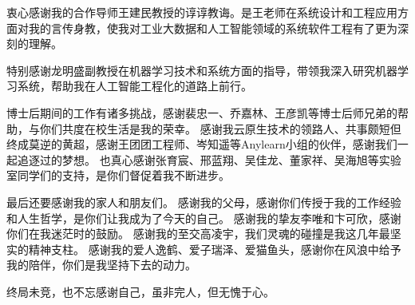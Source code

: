 
\begin{acknowledgements}
  衷心感谢我的合作导师王建民教授的谆谆教诲。是王老师在系统设计和工程应用方面对我的言传身教，使我对工业大数据和人工智能领域的系统软件工程有了更为深刻的理解。

  特别感谢龙明盛副教授在机器学习技术和系统方面的指导，带领我深入研究机器学习系统，帮助我在人工智能工程化的道路上前行。

  博士后期间的工作有诸多挑战，感谢裴忠一、乔嘉林、王彦凯等博士后师兄弟的帮助，与你们共度在校生活是我的荣幸。
  感谢我云原生技术的领路人、共事颇短但终成莫逆的黄超，感谢王团团工程师、岑知遥等Anylearn小组的伙伴，感谢我们一起追逐过的梦想。
  也真心感谢张育宸、邢蓝翔、吴佳龙、董家祥、吴海旭等实验室同学们的支持，是你们督促着我不断进步。
  
  最后还要感谢我的家人和朋友们。
  感谢我的父母，感谢你们传授于我的工作经验和人生哲学，是你们让我成为了今天的自己。
  感谢我的挚友李唯和卞可欣，感谢你们在我迷茫时的鼓励。
  感谢我的至交高凌宇，我们灵魂的碰撞是我这几年最坚实的精神支柱。
  感谢我的爱人逸鹤、爱子瑞泽、爱猫鱼头，感谢你在风浪中给予我的陪伴，你们是我坚持下去的动力。

  终局未竞，也不忘感谢自己，虽非完人，但无愧于心。
\end{acknowledgements}
